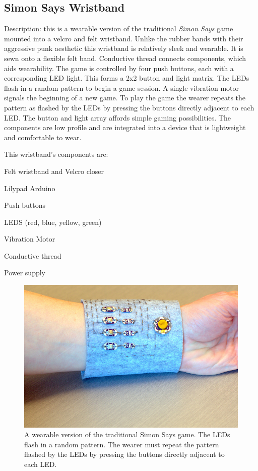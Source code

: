 \documentclass{chi-ext}
\begin{document}
\subsection{Simon Says Wristband}
Description: this is a wearable version of the traditional \emph{Simon Says} game mounted into a velcro and felt wristband. Unlike the rubber bands with their aggressive punk aesthetic this wristband is relatively sleek and wearable. It is sewn onto a flexible felt band. Conductive thread connects components, which aids wearability. The game is controlled by four push buttons, each with a corresponding LED light. This forms a 2x2 button and light matrix. The LEDs flash in a random pattern to begin a game session. A single vibration motor signals the beginning of a new game. To play the game the wearer repeats the pattern as flashed by the LEDs by pressing the buttons directly adjacent to each LED. The button and light array affords simple gaming possibilities. The components are low profile and are integrated into a device that is lightweight and comfortable to wear. 

This wristband's components are:
\begin{inparaenum}
\item Felt wristband and Velcro closer
\item Lilypad Arduino
\item Push buttons
\item LEDS (red, blue, yellow, green)
\item Vibration Motor
\item Conductive thread
\item Power supply
\end{inparaenum}

\begin{figure}
  \begin{center}
  \includegraphics[width=\columnwidth]{images/P1130375.jpg}
  \caption{A wearable version of the traditional Simon Says game. The LEDs flash in a random pattern. The wearer must repeat the pattern flashed by the LEDs by pressing the buttons directly adjacent to each LED.}
  \label{fig:simonSays}
  \end{center}  
\end{figure}
\end{document}
